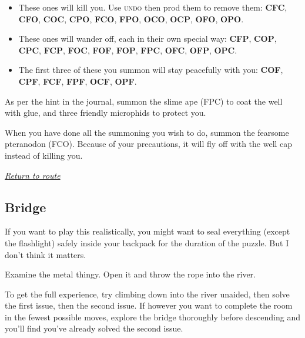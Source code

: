\documentclass[a5paper]{extarticle}
\begin{document}
\begin{itemize}
\item
These ones will kill you. Use \textsc{undo} then prod them to remove them:\newline
\textbf{CFC},\enskip
\textbf{CFO},\enskip
\textbf{COC},\enskip
\textbf{CPO},\enskip
\textbf{FCO},\enskip
\textbf{FPO},\enskip
\textbf{OCO},\enskip
\textbf{OCP},\enskip
\textbf{OFO},\enskip
\textbf{OPO}.

\item
These ones will wander off, each in their own special way:\newline
\textbf{CFP},\enskip
\textbf{COP},\enskip
\textbf{CPC},\enskip
\textbf{FCP},\enskip
\textbf{FOC},\enskip
\textbf{FOF},\enskip
\textbf{FOP},\enskip
\textbf{FPC},\enskip
\textbf{OFC},\enskip
\textbf{OFP},\enskip
\textbf{OPC}.

\item
The first three of these you summon will stay peacefully with you:\newline
\textbf{COF},\enskip
\textbf{CPF},\enskip
\textbf{FCF},\enskip
\textbf{FPF},\enskip
\textbf{OCF},\enskip
\textbf{OPF}.
\end{itemize}

As per the hint in the journal, summon the slime ape (FPC) to coat the well with glue, and three friendly microphids to protect you.

When you have done all the summoning you wish to do,
summon the fearsome pteranodon (FCO).
Because of your precautions, it will fly off with the well cap instead of killing you.

\hyperref[sec:route-2]{\emph{Return to route}}

\newpage
\subsection{Bridge}\label{sec:sol-Bridge}

If you want to play this realistically, you might want to seal everything
(except the flashlight) safely inside your backpack for the duration of the puzzle.
But I don't think it matters.

Examine the metal thingy. Open it and throw the rope into the river.

To get the full experience, try climbing down into the river unaided,
then solve the first issue, then the second issue.
If however you want to complete the room in the fewest possible moves,
explore the bridge thoroughly before descending
and you'll find you've already solved the second issue.
\end{document}
